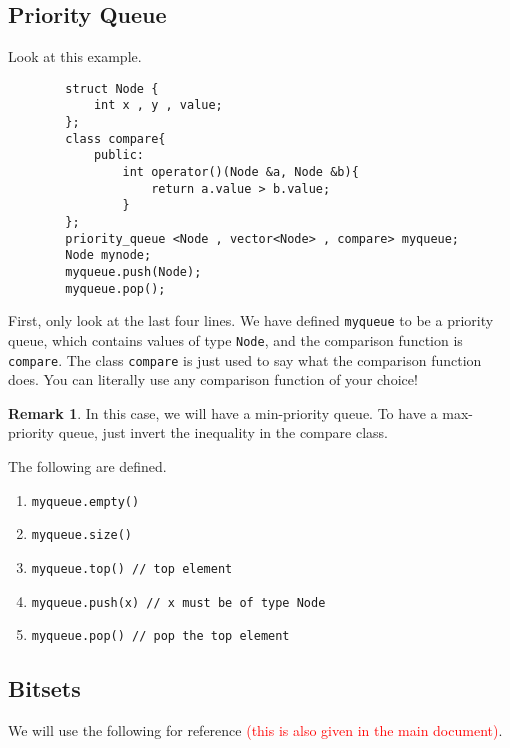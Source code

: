 \documentclass[12pt,a4paper]{amsart}
\numberwithin{equation}{section}
\theoremstyle{definition}
\newtheorem{Remark}{Remark}[Th]
\begin{document}
\subsection{Priority Queue} Look at this example. 
    \begin{lstlisting}  
        struct Node {
            int x , y , value;
        };
        class compare{
            public: 
                int operator()(Node &a, Node &b){
                    return a.value > b.value;
                }
        };
        priority_queue <Node , vector<Node> , compare> myqueue;
        Node mynode;
        myqueue.push(Node);
        myqueue.pop();
    \end{lstlisting}
First, only look at the last four lines. We have defined \verb|myqueue| to be a priority queue, which contains values of type \verb|Node|, and the comparison function is \verb|compare|. The class \verb|compare| is just used to say what the comparison function does. You can literally use any comparison function of your choice! 

\begin{Remark}
    In this case, we will have a min-priority queue. To have a max-priority queue, just invert the inequality in the compare class. 
\end{Remark}

\noindent The following are defined. 
\begin{enumerate}
    \item \verb|myqueue.empty()|
    \item \verb|myqueue.size()|
    \item \verb|myqueue.top() // top element|
    \item \verb|myqueue.push(x) // x must be of type Node|
    \item \verb|myqueue.pop() // pop the top element|
\end{enumerate}

\subsection{Bitsets} We will use the following for reference \textcolor{red}{(this is also given in the main document)}.
\end{document}

